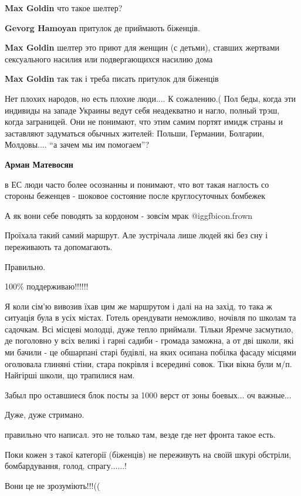 \begin{itemize}
\begin{itemize}
\textbf{Max Goldin} что такое шелтер?

\textbf{Gevorg Hamoyan} притулок де приймають біженців.

\textbf{Max Goldin} шелтер это приют для женщин (с детьми), ставших жертвами сексуального насилия или подвергающихся насилию дома

\textbf{Max Goldin} так так і треба писать притулок для біженців

\end{itemize} %


Нет плохих народов, но есть плохие люди.... К сожалению.( Пол беды, когда эти
индивиды на западе Украины ведут себя неадекватно и нагло, полный трэш, когда
заграницей. Они не понимают, что этим самим портят имидж страны и заставляют
задуматься обычных жителей: Польши, Германии, Болгарии, Молдовы.... \enquote{а зачем мы
им помогаем}?

\textbf{Арман Матевосян} 

в ЕС люди часто более осознанны и понимают, что вот такая наглость со стороны
беженцев - шоковое состояние после круглосуточных бомбежек

А як вони себе поводять за кордоном - зовсім мрак  @igg{fbicon.frown} 

Проїхала такий самий маршрут. Але зустрічала лише людей які без сну і переживають та допомагають.

Правильно.

100\% поддерживаю!!!!!!


Я коли сім'ю вивозив їхав цим же маршрутом і далі на на захід, то така ж
ситуація була в усіх містах. Готель орендувати неможливо, ночівля по школам та
садочкам. Всі місцеві молодці, дуже тепло приймали. Тільки Яремче засмутило, де
поголовно у всіх великі і гарні садиби - громада заможна, а от дві школи, які
ми бачили - це обшарпані старі будівлі, на яких осипана побілка фасаду місцями
оголювала глиняні стіни, стара покрівля і всередині совок. Тіки вікна були м/п.
Найгірші школи, що трапилися нам.

Забыл про оставшиеся блок посты за 1000 верст от зоны боевых... оч важные...

Дуже, дуже стримано.

правильно что написал. это не только там, везде где нет фронта такое есть.


Поки кожен з такої категорії (біженців) не переживуть на своїй шкурі обстріли,
бомбардування, голод, спрагу......!

Вони це не зрозуміють!!!((

\end{itemize} %
